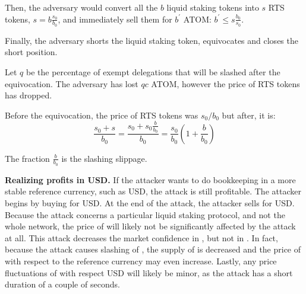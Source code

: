 Then, the adversary would convert all the $b$ liquid staking tokens into
$s$ RTS tokens, $s = b \frac{s_0}{b_0}$, and immediately sell them for
$b^{'}$ ATOM: $b^{'} \leq s \frac{b_0}{s_0}$.

Finally, the adversary shorts the liquid staking token, equivocates
and closes the short position.

Let $q$ be the percentage of exempt delegations that will be slashed after
the equivocation. The adversary has lost $qc$ ATOM, however the price of RTS
tokens has dropped.

Before the equivocation, the price of RTS tokens was $s_0/b_0$ but
after, it is:
\[
\frac{s_0 + s}{b_0} =
\frac{s_0 + s_0\frac{b}{b_0}}{b_0} =
\frac{s_0}{b_0} (1 + \frac{b}{b_0})
\]

The fraction $\frac{b}{b_0}$ is the slashing slippage.

\noindent
\textbf{Realizing profits in USD.}
If the attacker wants to do bookkeeping in a more stable reference currency,
such as USD, the attack is still profitable. The attacker begins by buying
\asset for USD. At the end of the attack, the attacker sells \asset for USD.
Because the attack concerns a particular liquid staking protocol, and
not the whole \asset network, the price of \asset will likely not
be significantly affected by the attack at all.
This attack decreases the market confidence in \stasset,
but not in \asset.
In fact, because
the attack causes slashing of \asset, the supply of \asset is decreased
and the price of \asset with respect to the reference currency may
even increase.
Lastly, any price fluctuations of \asset with respect USD will likely be
minor, as the attack has a short duration of a couple of seconds.
